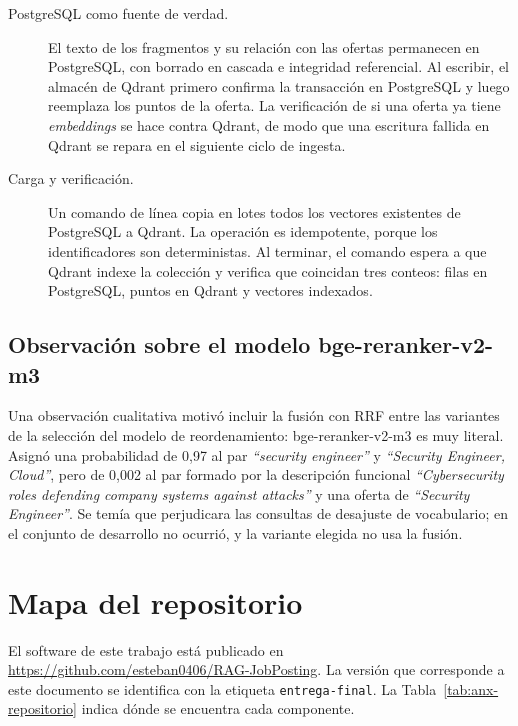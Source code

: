 \begin{description}
    \item[PostgreSQL como fuente de verdad.] El texto de los fragmentos y su relación con las ofertas permanecen en PostgreSQL, con borrado en cascada e integridad referencial. Al escribir, el almacén de Qdrant primero confirma la transacción en PostgreSQL y luego reemplaza los puntos de la oferta. La verificación de si una oferta ya tiene \textit{embeddings} se hace contra Qdrant, de modo que una escritura fallida en Qdrant se repara en el siguiente ciclo de ingesta.
    \item[Carga y verificación.] Un comando de línea copia en lotes todos los vectores existentes de PostgreSQL a Qdrant. La operación es idempotente, porque los identificadores son deterministas. Al terminar, el comando espera a que Qdrant indexe la colección y verifica que coincidan tres conteos: filas en PostgreSQL, puntos en Qdrant y vectores indexados.
\end{description}

\section{Observación sobre el modelo bge-reranker-v2-m3}

Una observación cualitativa motivó incluir la fusión con RRF entre las variantes de la selección del modelo de reordenamiento: bge-reranker-v2-m3 es muy literal. Asignó una probabilidad de 0,97 al par \textit{\enquote{security engineer}} y \textit{\enquote{Security Engineer, Cloud}}, pero de 0,002 al par formado por la descripción funcional \textit{\enquote{Cybersecurity roles defending company systems against attacks}} y una oferta de \textit{\enquote{Security Engineer}}. Se temía que perjudicara las consultas de desajuste de vocabulario; en el conjunto de desarrollo no ocurrió, y la variante elegida no usa la fusión.

\chapter{Mapa del repositorio}
\label{anx:repositorio}

El software de este trabajo está publicado en \url{https://github.com/esteban0406/RAG-JobPosting}. La versión que corresponde a este documento se identifica con la etiqueta \texttt{entrega-final}. La Tabla~\ref{tab:anx-repositorio} indica dónde se encuentra cada componente.

